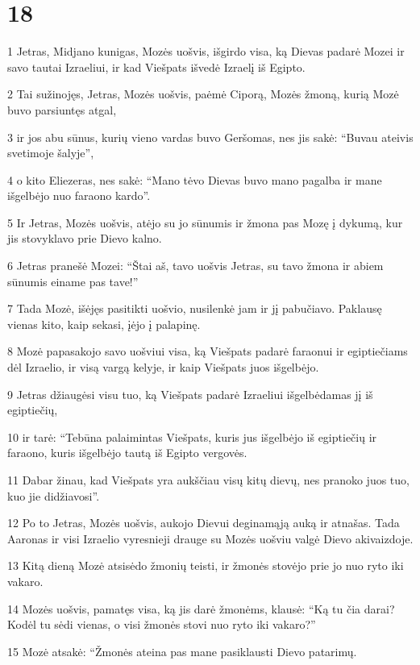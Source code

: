 \chapter{18}


\par 1 Jetras, Midjano kunigas, Mozės uošvis, išgirdo visa, ką Dievas padarė Mozei ir savo tautai Izraeliui, ir kad Viešpats išvedė Izraelį iš Egipto. 
\par 2 Tai sužinojęs, Jetras, Mozės uošvis, paėmė Ciporą, Mozės žmoną, kurią Mozė buvo parsiuntęs atgal, 
\par 3 ir jos abu sūnus, kurių vieno vardas buvo Geršomas, nes jis sakė: “Buvau ateivis svetimoje šalyje”, 
\par 4 o kito Eliezeras, nes sakė: “Mano tėvo Dievas buvo mano pagalba ir mane išgelbėjo nuo faraono kardo”. 
\par 5 Ir Jetras, Mozės uošvis, atėjo su jo sūnumis ir žmona pas Mozę į dykumą, kur jis stovyklavo prie Dievo kalno. 
\par 6 Jetras pranešė Mozei: “Štai aš, tavo uošvis Jetras, su tavo žmona ir abiem sūnumis einame pas tave!” 
\par 7 Tada Mozė, išėjęs pasitikti uošvio, nusilenkė jam ir jį pabučiavo. Paklausę vienas kito, kaip sekasi, įėjo į palapinę. 
\par 8 Mozė papasakojo savo uošviui visa, ką Viešpats padarė faraonui ir egiptiečiams dėl Izraelio, ir visą vargą kelyje, ir kaip Viešpats juos išgelbėjo. 
\par 9 Jetras džiaugėsi visu tuo, ką Viešpats padarė Izraeliui išgelbėdamas jį iš egiptiečių, 
\par 10 ir tarė: “Tebūna palaimintas Viešpats, kuris jus išgelbėjo iš egiptiečių ir faraono, kuris išgelbėjo tautą iš Egipto vergovės. 
\par 11 Dabar žinau, kad Viešpats yra aukščiau visų kitų dievų, nes pranoko juos tuo, kuo jie didžiavosi”. 
\par 12 Po to Jetras, Mozės uošvis, aukojo Dievui deginamąją auką ir atnašas. Tada Aaronas ir visi Izraelio vyresnieji drauge su Mozės uošviu valgė Dievo akivaizdoje. 
\par 13 Kitą dieną Mozė atsisėdo žmonių teisti, ir žmonės stovėjo prie jo nuo ryto iki vakaro. 
\par 14 Mozės uošvis, pamatęs visa, ką jis darė žmonėms, klausė: “Ką tu čia darai? Kodėl tu sėdi vienas, o visi žmonės stovi nuo ryto iki vakaro?” 
\par 15 Mozė atsakė: “Žmonės ateina pas mane pasiklausti Dievo patarimų. 
